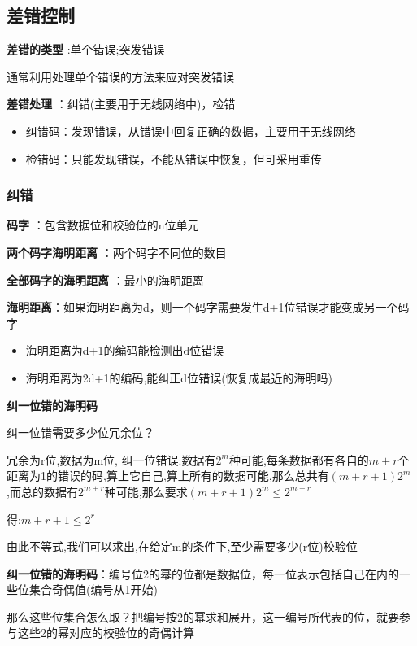 \documentclass[UTF8,a4paper]{ctexart}
\begin{document}
  \subsection{差错控制}
  \textbf{差错的类型} :单个错误;突发错误

  通常利用处理单个错误的方法来应对突发错误

  \textbf{差错处理} ：纠错(主要用于无线网络中)，检错
  \begin{itemize}
    \item 纠错码：发现错误，从错误中回复正确的数据，主要用于无线网络
    \item 检错码：只能发现错误，不能从错误中恢复，但可采用重传
  \end{itemize}

  \subsubsection{纠错}

  \textbf{码字} ：包含数据位和校验位的n位单元

  \textbf{两个码字海明距离} ：两个码字不同位的数目

  \textbf{全部码字的海明距离} ：最小的海明距离

  \textbf{海明距离}：如果海明距离为d，则一个码字需要发生d+1位错误才能变成另一个码字

  \begin{itemize}
    \item 海明距离为d+1的编码能检测出d位错误
    \item 海明距离为2d+1的编码,能纠正d位错误(恢复成最近的海明吗)
  \end{itemize}

  \textbf{纠一位错的海明码}

  纠一位错需要多少位冗余位？

  冗余为r位,数据为m位, 纠一位错误:数据有$2^m$种可能,每条数据都有各自的$m+r$个距离为1的错误的码,算上它自己,算上所有的数据可能,那么总共有$(m+r+1)2^{m}$ ,而总的数据有$2^{m+r}$种可能,那么要求$(m+r+1)2^{m} \leq 2^{m + r}$

  得:$m + r + 1 \leq 2^r$

  由此不等式,我们可以求出,在给定m的条件下,至少需要多少(r位)校验位

  \textbf{纠一位错的海明码}：编号位2的幂的位都是数据位，每一位表示包括自己在内的一些位集合奇偶值(编号从1开始)

  那么这些位集合怎么取？把编号按2的幂求和展开，这一编号所代表的位，就要参与这些2的幂对应的校验位的奇偶计算
\end{document}
